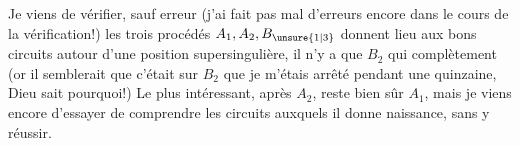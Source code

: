 Je viens de vérifier, sauf erreur (j'ai fait pas mal d'erreurs encore dans le cours de la vérification!) les trois procédés $A_1,A_2,B_{\unsure{1|3}}$ donnent lieu aux bons circuits autour d'une position supersingulière, il n'y a que $B_2$ qui  complètement (or il semblerait que c'était sur $B_2$ que je m'étais arrêté pendant une quinzaine, Dieu sait pourquoi!)
Le plus intéressant, après $A_2$, reste bien sûr $A_1$, mais je viens encore d'essayer de comprendre les circuits auxquels il donne naissance, sans y réussir.
